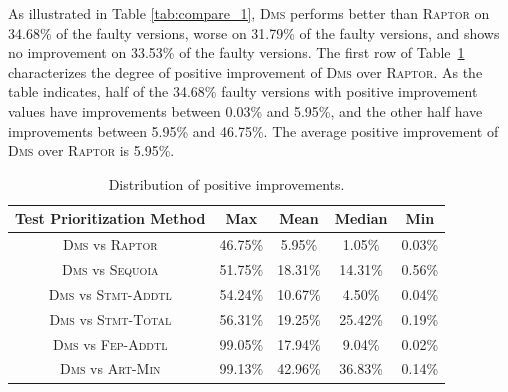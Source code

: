 As illustrated in Table \ref{tab:compare_1}, \textsc{Dms} performs better than \textsc{Raptor} on 34.68\% of the faulty versions, worse on 31.79\% of the faulty versions, and shows no improvement on 33.53\% of the faulty versions. The first row of Table~\ref{tab:compare_2} characterizes the degree of positive improvement of \textsc{Dms} over \textsc{Raptor}. As the table indicates, half of the 34.68\% faulty versions with positive improvement values have improvements between 0.03\% and 5.95\%, and the other half have improvements between 5.95\% and 46.75\%. The average positive improvement of \textsc{Dms} over \textsc{Raptor} is 5.95\%.

%
\begin{table}[!htbp]
    \centering
		\caption{Distribution of positive improvements.}
		\renewcommand{\arraystretch}{1.5}
		\small
        \begin{tabular}{|c|c|c|c|c|}
			\hline
			Test Prioritization Method  &        Max &       Mean &     Median &        Min \\
			\hline\hline
			\textsc{Dms} vs \textsc{Raptor} & {  46.75\%} &     5.95\% &     1.05\% &     0.03\% \\
			\hline
			\textsc{Dms} vs \textsc{Sequoia} & {  51.75\%} &   18.31\% &     14.31\% &     0.56\% \\
			\hline
			\textsc{Dms} vs \textsc{Stmt-Addtl} & {   54.24\%} &    10.67\% &     4.50\% &     0.04\% \\
			\hline
			\textsc{Dms} vs \textsc{Stmt-Total} & {  56.31\%} &    19.25\% &    25.42\% &     0.19\% \\
			\hline
			\textsc{Dms} vs \textsc{Fep-Addtl} & {  99.05\%} &    17.94\% &     9.04\% &     0.02\% \\
			\hline
			\textsc{Dms} vs \textsc{Art-Min} & {  99.13\%} &     42.96\% &     36.83\% &     0.14\% \\
			\hline
		\end{tabular}
    \label{tab:compare_2}
\end{table}



